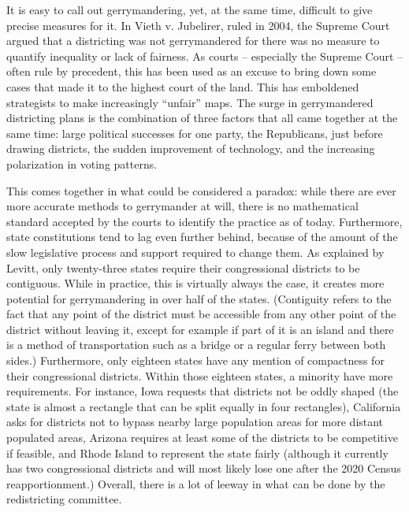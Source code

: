 \documentclass[letterpaper]{article}
\begin{document}
It is easy to call out gerrymandering, yet, at the same time, difficult to give precise measures for it. In Vieth v. Jubelirer, ruled in 2004, the Supreme Court argued that a districting was not gerrymandered for there was no measure to quantify inequality or lack of fairness. As courts – especially the Supreme Court – often rule by precedent, this has been used as an excuse to bring down some cases that made it to the highest court of the land. This has emboldened strategists to make increasingly “unfair” maps. The surge in gerrymandered districting plans is the combination of three factors that all came together at the same time: large political successes for one party, the Republicans, just before drawing districts, the sudden improvement of technology, and the increasing polarization in voting patterns.


This comes together in what could be considered a paradox: while there are ever more accurate methods to gerrymander at will, there is no mathematical standard accepted by the courts to identify the practice as of today. Furthermore, state constitutions tend to lag even further behind, because of the amount of the slow legislative process and support required to change them. As explained by Levitt, only twenty-three states require their congressional districts to be contiguous. While in practice, this is virtually always the case, it creates more potential for gerrymandering in over half of the states. (Contiguity refers to the fact that any point of the district must be accessible from any other point of the district without leaving it, except for example if part of it is an island and there is a method of transportation such as a bridge or a regular ferry between both sides.) Furthermore, only eighteen states have any mention of compactness for their congressional districts. Within those eighteen states, a minority have more requirements. For instance, Iowa requests that districts not be oddly shaped (the state is almost a rectangle that can be split equally in four rectangles), California asks for districts not to bypass nearby large population areas for more distant populated areas, Arizona requires at least some of the districts to be competitive if feasible, and Rhode Island to represent the state fairly (although it currently has two congressional districts and will most likely lose one after the 2020 Census reapportionment.) Overall, there is a lot of leeway in what can be done by the redistricting committee. 
\end{document}
